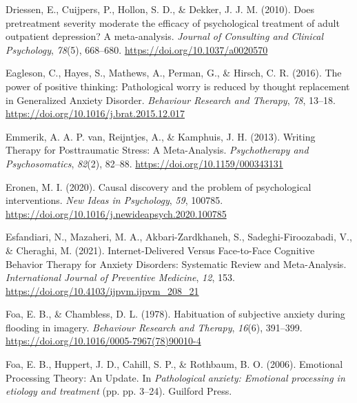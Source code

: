\documentclass[
  man,floatsintext]{apa7}
\newlength{\cslhangindent}
\newlength{\cslentryspacingunit} %
\newenvironment{CSLReferences}[2] %
 {%
  \setlength{\parindent}{0pt}
  \ifodd #1
  \let\oldpar\par
  \def\par{\hangindent=\cslhangindent\oldpar}
  \fi
  \setlength{\parskip}{#2\cslentryspacingunit}
 }%
 {}
\begin{document}
\begin{CSLReferences}{1}{0}
\leavevmode{}%
Driessen, E., Cuijpers, P., Hollon, S. D., \& Dekker, J. J. M. (2010). Does pretreatment severity moderate the efficacy of psychological treatment of adult outpatient depression? A meta-analysis. \emph{Journal of Consulting and Clinical Psychology}, \emph{78}(5), 668--680. \url{https://doi.org/10.1037/a0020570}

\leavevmode{}%
Eagleson, C., Hayes, S., Mathews, A., Perman, G., \& Hirsch, C. R. (2016). The power of positive thinking: Pathological worry is reduced by thought replacement in Generalized Anxiety Disorder. \emph{Behaviour Research and Therapy}, \emph{78}, 13--18. \url{https://doi.org/10.1016/j.brat.2015.12.017}

\leavevmode{}%
Emmerik, A. A. P. van, Reijntjes, A., \& Kamphuis, J. H. (2013). Writing Therapy for Posttraumatic Stress: A Meta-Analysis. \emph{Psychotherapy and Psychosomatics}, \emph{82}(2), 82--88. \url{https://doi.org/10.1159/000343131}

\leavevmode{}%
Eronen, M. I. (2020). Causal discovery and the problem of psychological interventions. \emph{New Ideas in Psychology}, \emph{59}, 100785. \url{https://doi.org/10.1016/j.newideapsych.2020.100785}

\leavevmode{}%
Esfandiari, N., Mazaheri, M. A., Akbari-Zardkhaneh, S., Sadeghi-Firoozabadi, V., \& Cheraghi, M. (2021). Internet-Delivered Versus Face-to-Face Cognitive Behavior Therapy for Anxiety Disorders: Systematic Review and Meta-Analysis. \emph{International Journal of Preventive Medicine}, \emph{12}, 153. \url{https://doi.org/10.4103/ijpvm.ijpvm_208_21}

\leavevmode{}%
Foa, E. B., \& Chambless, D. L. (1978). Habituation of subjective anxiety during flooding in imagery. \emph{Behaviour Research and Therapy}, \emph{16}(6), 391--399. \url{https://doi.org/10.1016/0005-7967(78)90010-4}

\leavevmode{}%
Foa, E. B., Huppert, J. D., Cahill, S. P., \& Rothbaum, B. O. (2006). Emotional Processing Theory: An Update. In \emph{Pathological anxiety: Emotional processing in etiology and treatment} (pp. pp. 3--24). Guilford Press.


\end{CSLReferences}
\end{document}
